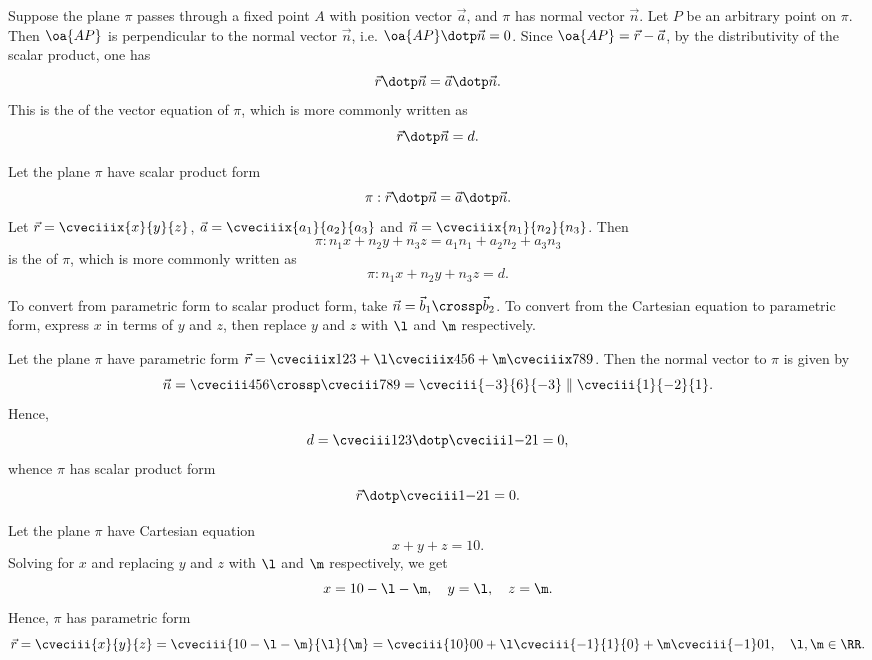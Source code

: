 \begin{definition}
    Suppose the plane $\pi$ passes through a fixed point $A$ with position vector $\vec a$, and $\pi$ has normal vector $\vec n$. Let $P$ be an arbitrary point on $\pi$. Then $\oa{AP}$ is perpendicular to the normal vector $\vec n$, i.e. $\oa{AP} \dotp \vec n = 0$. Since $\oa{AP} = \vec r - \vec a$, by the distributivity of the scalar product, one has \[\vec r \dotp \vec n = \vec a \dotp \vec n.\] This is the  of the vector equation of $\pi$, which is more commonly written as \[\vec r \dotp \vec n = d.\]
\end{definition}

\begin{definition}
    Let the plane $\pi$ have scalar product form \[\pi : \vec r \dotp \vec n = \vec a \dotp \vec n.\] Let $\vec r = \cveciiix{x}{y}{z}$, $\vec a = \cveciiix{a_1}{a_2}{a_3}$ and $\vec n = \cveciiix{n_1}{n_2}{n_3}$. Then \[\pi : n_1 x + n_2 y + n_3 z = a_1 n_1 + a_2 n_2 + a_3 n_3\] is the  of $\pi$, which is more commonly written as \[\pi : n_1 x + n_2 y + n_3 z = d.\]
\end{definition}

\begin{recipe}
    To convert from parametric form to scalar product form, take $\vec n = \vec b_1 \crossp \vec b_2$. To convert from the Cartesian equation to parametric form, express $x$ in terms of $y$ and $z$, then replace $y$ and $z$ with $\l$ and $\m$ respectively.
\end{recipe}

\begin{example}
    Let the plane $\pi$ have parametric form $\vec r = \cveciiix123 + \l \cveciiix456 + \m \cveciiix789$. Then the normal vector to $\pi$ is given by \[\vec n = \cveciii456 \crossp \cveciii789 = \cveciii{-3}{6}{-3} \parallel \cveciii{1}{-2}{1}.\] Hence, \[d = \cveciii123 \dotp \cveciii1{-2}1 = 0,\] whence $\pi$ has scalar product form \[\vec r \dotp \cveciii1{-2}1 = 0.\]
\end{example}

\begin{example}
    Let the plane $\pi$ have Cartesian equation \[x + y + z = 10.\] Solving for $x$ and replacing $y$ and $z$ with $\l$ and $\m$ respectively, we get \[x = 10 - \l - \m, \quad y = \l, \quad z = \m.\] Hence, $\pi$ has parametric form \[\vec r = \cveciii{x}{y}{z} = \cveciii{10 - \l - \m}{\l}{\m} = \cveciii{10}00 + \l \cveciii{-1}{1}{0} + \m \cveciii{-1}0{1}, \quad \l, \m \in \RR.\]
\end{example}

